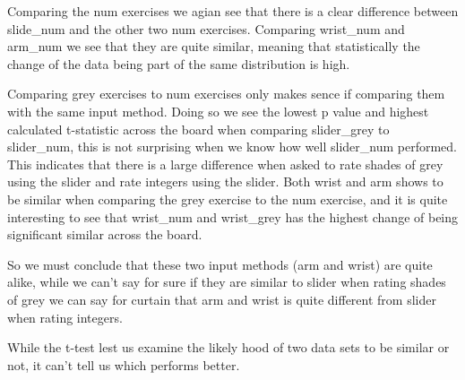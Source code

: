 Comparing the num exercises we agian see that there is a clear difference between slide\_num and the other two num exercises. Comparing wrist\_num and arm\_num we see that they are quite similar, meaning that statistically the change of the data being part of the same distribution is high.

Comparing grey exercises to num exercises only makes sence if comparing them with the same input method. Doing so we see the lowest p value and highest calculated t-statistic across the board when comparing slider\_grey to slider\_num, this is not surprising when we know how well slider\_num performed. This indicates that there is a large difference when asked to rate shades of grey using the slider and rate integers using the slider. Both wrist and arm shows to be similar when comparing the grey exercise to the num exercise, and it is quite interesting to see that wrist\_num and wrist\_grey has the highest change of being significant similar across the board. 


So we must conclude that these two input methods (arm and wrist) are quite alike, while we can't say for sure if they are similar to slider when rating shades of grey we can say for curtain that arm and wrist is quite different from slider when rating integers.


While the t-test lest us examine the likely hood of two data sets to be similar or not, it can't tell us which performs better.



